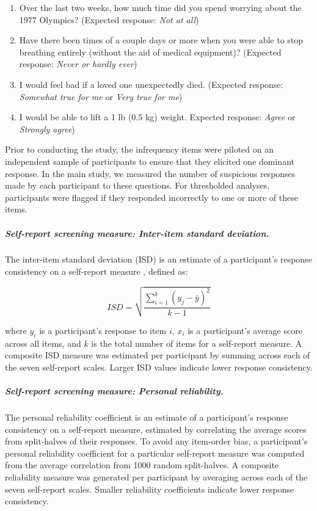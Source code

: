 \documentclass[a4paper,notitlepage,12pt]{article}
\begin{document}
\begin{refsection}[main]
\begin{enumerate}
  \item Over the last two weeks, how much time did you spend worrying about the 1977 Olympics? (Expected response: \textit{Not at all})
  \item Have there been times of a couple days or more when you were able to stop breathing entirely (without the aid of medical equipment)? (Expected response: \textit{Never or hardly ever})
  \item I would feel bad if a loved one unexpectedly died. (Expected response: \textit{Somewhat true for me} or \textit{Very true for me})
  \item I would be able to lift a 1 lb (0.5 kg) weight. Expected response: \textit{Agree} or \textit{Strongly agree})
\end{enumerate}

Prior to conducting the study, the infrequency items were piloted on an independent sample of participants to ensure that they elicited one dominant response. In the main study, we measured the number of suspicious responses made by each participant to these questions. For thresholded analyses, participants were flagged if they responded incorrectly to one or more of these items.

\subparagraph{Self-report screening measure: Inter-item standard deviation.} The inter-item standard deviation (ISD) is an estimate of a participant's response consistency on a self-report measure \cite{marjanovic2015inter}, defined as:

\begin{equation*}
    ISD = \sqrt{\frac{\sum^k_{i=1}(y_j - \bar{y})^2}{k-1}}
\end{equation*}

where $y_i$ is a participant's response to item $i$, $x_i$ is a participant's average score across all  items, and $k$ is the total number of items for a self-report measure. A composite ISD measure was estimated per participant by summing across each of the seven self-report scales. Larger ISD values indicate lower response consistency.

\subparagraph{Self-report screening measure: Personal reliability.} The personal reliability coefficient is an estimate of a participant's response consistency on a self-report measure, estimated by correlating the average scores from split-halves of their responses. To avoid any item-order bias, a participant's personal reliability coefficient for a particular self-report measure was computed from the average correlation from 1000 random split-halves. A composite reliability measure was generated per participant by averaging across each of the seven self-report scales. Smaller reliability coefficients indicate lower response consistency.  


\end{refsection}
\end{document}
